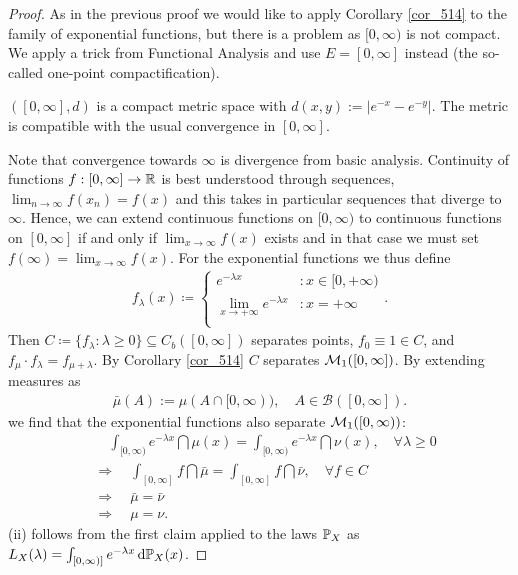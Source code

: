 \begin{proof}[Proof]
As in the previous proof we would like to apply Corollary \ref{cor_514} to the family of exponential functions, but there is a problem as $[0,\infty)$ is not compact. We apply a trick from Functional Analysis and use $E = [0, \infty]$ instead (the so-called one-point compactification).
\begin{luebung}
	$([0,\infty],d)$ is a compact metric space with $d(x,y):=|e^{-x}-e^{-y}|$. The metric is compatible with the usual convergence in $[0,\infty]$.
\end{luebung}
Note that convergence towards $\infty$ is divergence from basic analysis. Continuity of functions $f:[0,\infty]\to \R$ is best understood through sequences, $\lim_{n\to\infty} f(x_n)=f(x)$ and this takes in particular sequences that diverge to $\infty$. Hence, we can extend continuous functions on $[0,\infty)$ to continuous functions on $[0,\infty]$ if and only if $\lim_{x\to\infty} f(x)$ exists and in that case we must set $f(\infty)=\lim_{x\to\infty} f(x)$. For the exponential functions we thus define
\begin{align*}
	f_{\lambda}(x) \coloneqq \begin{cases}
			e^{- \lambda x} &: x\in [0,+\infty) \\
			\lim_{x\to+\infty} e^{- \lambda x} &: x=+\infty \\
			 \end{cases}.
\end{align*}
Then $C\coloneqq \{ f_{\lambda} \colon \lambda \geq 0 \}\subseteq C_b([0,\infty])$ separates points, $f_0 \equiv 1\in C$, and $f_{\mu}\cdot f_{\lambda} = f_{\mu + \lambda}$. By Corollary \ref{cor_514} $C$ separates $\cM_1([0,\infty])$. By extending measures as
\begin{align*}
	\bar \mu(A):=\mu(A\cap [0,\infty)),\quad A\in \mathcal B([0,\infty]).
\end{align*}
we find that the exponential functions also separate $\cM_1([0,\infty))$:
\begin{align*}
	&\quad \int_{[0,\infty)} e^{-\lambda x}\dint \mu(x)
	=\int_{[0,\infty)} e^{-\lambda x}\dint \nu(x),\quad \forall \lambda \geq 0\\
	& \Rightarrow \quad \int_{[0,\infty]}f \dint \bar \mu=\int_{[0,\infty]}f \dint \bar \nu,\quad \forall f\in C\\
	& \Rightarrow\quad \bar \mu=\bar \nu\\
	&\Rightarrow\quad \mu=\nu.
\end{align*}	
(ii) follows from the first claim applied to the laws $\P_X$ as $L_X(\lambda)=\int_{[0,\infty)]}e^{-\lambda x}\dint \P_X(x)$.

\end{proof}
